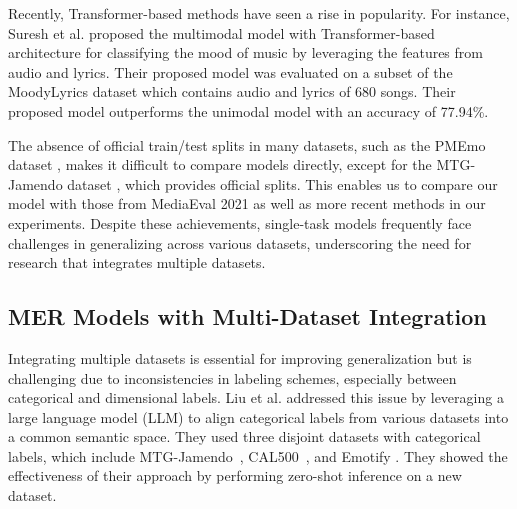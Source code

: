 

Recently, Transformer-based methods have seen a rise in popularity. For instance, Suresh et al. \cite{suresh2023transformer} proposed the multimodal model with Transformer-based architecture for classifying the mood of music by leveraging the features from audio and lyrics. Their proposed model was evaluated on a subset of the MoodyLyrics dataset \cite{ccano2017moodylyrics} which contains audio and lyrics of 680 songs. Their proposed model outperforms the unimodal model with an accuracy of 77.94\%.

The absence of official train/test splits in many datasets, such as the PMEmo dataset \cite{zhang2018pmemo}, makes it difficult to compare models directly, except for the MTG-Jamendo dataset \cite{bogdanov2019mtg}, which provides official splits. This enables us to compare our model with those from MediaEval 2021 \cite{bour2021frequency,pham2021selab,tan2021semi,mayerl2021recognizing} as well as more recent methods \cite{hasumi2025music,greer2023creating,li2023mert} in our experiments. Despite these achievements, single-task models frequently face challenges in generalizing across various datasets, underscoring the need for research that integrates multiple datasets.


\subsection{MER Models with Multi-Dataset Integration}
Integrating multiple datasets is essential for improving generalization but is challenging due to inconsistencies in labeling schemes, especially between categorical and dimensional labels. Liu et al. \cite{liu2024leveraging} addressed this issue by leveraging a large language model (LLM) to align categorical labels from various datasets into a common semantic space. They used three disjoint datasets with categorical labels, which include MTG-Jamendo~\cite{bogdanov2019mtg}, CAL500~\cite{turnbull2007towards}, and Emotify \cite{aljanaki2016studying}. They showed the effectiveness of their approach by performing zero-shot inference on a new dataset.

